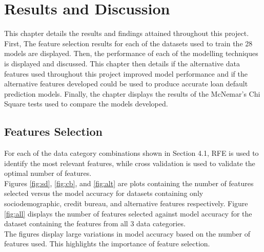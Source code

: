\chapter{Results and Discussion} 
\label{Chapter5}

This chapter details the results and findings attained throughout this project. First, The feature selection results for each of the datasets used to train the 28 models are displayed. Then, the performance of each of the modelling techniques is displayed and discussed. This chapter then details if the alternative data features used throughout this project improved model performance and if the alternative features developed could be used to produce accurate loan default prediction models. Finally, the chapter displays the results of the McNemar's Chi Square tests used to compare the models developed.   


\section{Features Selection}

For each of the data category combinations shown in Section 4.1, RFE is used to identify the most relevant features, while cross validation is used to validate the optimal number of features. \\

Figures \ref{fig:sd}, \ref{fig:cb}, and \ref{fig:alt} are plots containing the number of features selected versus the model accuracy for datasets containing only sociodemographic, credit bureau, and alternative features respectively. Figure \ref{fig:all} displays the number of features selected against model accuracy for the dataset containing the features from all 3 data categories. \\

The figures display large variations in model accuracy based on the number of features used. This highlights the importance of feature selection.

\vspace{10 pt}

